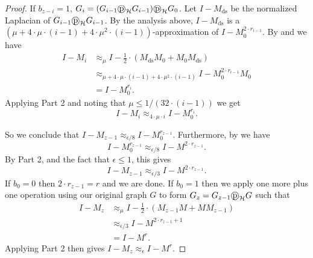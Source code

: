 \documentclass{toc}
\newcommand{\dpr}{\text{\textcircled{p}}_{\mathcal{H}}}
\numberwithin{myalgctr}{section}
\theoremstyle{named}
\begin{document}
\begin{proof}
If $b_{z-i}=1$, $G_{i}=(G_{i-1}\dpr G_{i-1})\dpr G_0$. Let $I-M_{\mathrm{ds}}$ be the normalized Laplacian of $G_{i-1}\dpr G_{i-1}$. By the analysis above, $I-M_{\mathrm{ds}}$ is a $(\mu +4\cdot\mu\cdot (i-1)+4\cdot\mu^2\cdot (i-1))$-approximation of $I-M_0^{2\cdot r_{i-1}}$. By  and  we have 
\begin{align*}
I-M_i &\approx_{\mu} I-\frac{1}{2}\cdot(M_{\mathrm{ds}}M_0 + M_0M_{\mathrm{ds}})\\
&\approx_{\mu +4\cdot\mu\cdot (i-1)+4\cdot\mu^2\cdot (i-1)} I-M_0^{2\cdot r_{i-1}}M_0\\
&=I-M_0^{r_i}.
\end{align*}
Applying  Part 2 and noting that $\mu\leq 1/(32\cdot(i-1))$ we get
\[
I-M_i \approx_{4\cdot\mu\cdot i} I-M_0^{r_i}.
\]

So we conclude that $I-M_{z-1}\approx_{\epsilon/8}I-M_0^{r_{z-1}}$. Furthermore, by  we have 
\[
I-M_0^{r_{z-1}}\approx_{\epsilon/8}I-M^{2\cdot r_{z-1}}.
\]
By  Part 2, and the fact that $\epsilon\leq 1$, this gives
\[
I-M_{z-1}\approx_{\epsilon/3}I-M^{2\cdot r_{z-1}}.
\]
If $b_0=0$ then $2\cdot r_{z-1}=r$ and we are done. If $b_0=1$ then we apply one more plus one operation using our original graph $G$ to form $G_z=G_{z-1}\dpr G$ such that
\begin{align*}
I-M_z &\approx_{\mu} I-\frac{1}{2}\cdot (M_{z-1}M+MM_{z-1})\\
&\approx_{\epsilon/3}I-M^{2\cdot r_{z-1}+1}\\
&=I-M^{r}.
\end{align*}
Applying  Part 2 then gives $I-M_z \approx_{\epsilon} I-M^{r}$.
\end{proof}

%
\end{document}
